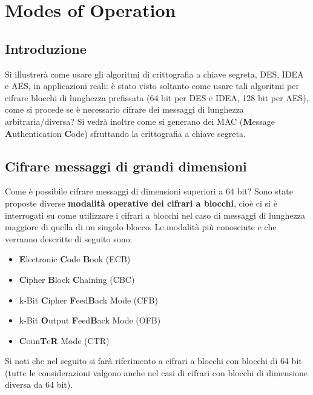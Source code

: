\chapter{Modes of Operation}

\section{Introduzione}
Si illustrerà come usare gli algoritmi di crittografia a chiave segreta, DES, IDEA e AES, in applicazioni reali: è stato visto soltanto come usare tali algoritmi per cifrare blocchi di lunghezza prefissata (64 bit per DES e IDEA, 128 bit per AES), come si procede se è necessario cifrare dei messaggi di lunghezza arbitraria/diversa? \newline \newline
Si vedrà inoltre come si generano dei MAC (\textbf{M}essage \textbf{A}uthentication \textbf{C}ode) sfruttando la crittografia a chiave segreta.

\section{Cifrare messaggi di grandi dimensioni}
Come è possibile cifrare messaggi di dimensioni superiori a 64 bit? \newline
Sono state proposte diverse \textbf{modalità operative dei cifrari a blocchi}, cioè ci si è interrogati su come utilizzare i cifrari a blocchi nel caso di messaggi di lunghezza maggiore di quella di un singolo blocco.\newline \newline
Le modalità più conosciute e che verranno descritte di seguito sono:
\begin{itemize}
  \item \textbf{E}lectronic \textbf{C}ode \textbf{B}ook (ECB)
  \item \textbf{C}ipher \textbf{B}lock \textbf{C}haining (CBC)
  \item k-Bit \textbf{C}ipher \textbf{F}eed\textbf{B}ack Mode (CFB)
  \item k-Bit \textbf{O}utput \textbf{F}eed\textbf{B}ack Mode (OFB)
  \item \textbf{C}oun\textbf{T}e\textbf{R} Mode (CTR)
\end{itemize} 
Si noti che nel seguito si farà riferimento a cifrari a blocchi con blocchi di 64 bit (tutte le considerazioni valgono anche nel casi di cifrari con blocchi di dimensione diversa da 64 bit).
